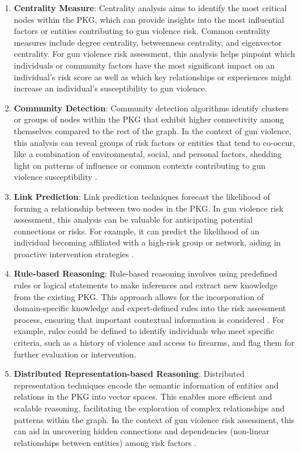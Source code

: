 \documentclass[11pt]{article}
\begin{document}
\begin{enumerate} [label=(\roman*)]
\item \textbf{Centrality Measure}: Centrality analysis aims to identify the most critical nodes within the PKG, which can provide insights into the most influential factors or entities contributing to gun violence risk. Common centrality measures include degree centrality, betweenness centrality, and eigenvector centrality. For gun violence risk assessment, this analysis helps pinpoint which individuals or community factors have the most significant impact on an individual's risk score \cite{yang2021research} as well as which key relationships or experiences might increase an individual’s susceptibility to gun violence.
\item \textbf{Community Detection}: Community detection algorithms identify clusters or groups of nodes within the PKG that exhibit higher connectivity among themselves compared to the rest of the graph. In the context of gun violence, this analysis can reveal groups of risk factors or entities that tend to co-occur, like a combination of environmental, social, and personal factors, shedding light on patterns of influence or common contexts contributing to gun violence susceptibility \cite{yang2021research}.
\item \textbf{Link Prediction}: Link prediction techniques forecast the likelihood of forming a relationship between two nodes in the PKG. In gun violence risk assessment, this analysis can be valuable for anticipating potential connections or risks. For example, it can predict the likelihood of an individual becoming affiliated with a high-risk group or network, aiding in proactive intervention strategies \cite{yang2021research}.
\item \textbf{Rule-based Reasoning}: Rule-based reasoning involves using predefined rules or logical statements to make inferences and extract new knowledge from the existing PKG. This approach allows for the incorporation of domain-specific knowledge and expert-defined rules into the risk assessment process, ensuring that important contextual information is considered \cite{sun2021generation}. For example, rules could be defined to identify individuals who meet specific criteria, such as a history of violence and access to firearms, and flag them for further evaluation or intervention.
\item \textbf{Distributed Representation-based Reasoning}: Distributed representation techniques encode the semantic information of entities and relations in the PKG into vector spaces. This enables more efficient and scalable reasoning, facilitating the exploration of complex relationships and patterns within the graph. In the context of gun violence risk assessment, this can aid in uncovering hidden connections and dependencies (non-linear relationships between entities) among risk factors \cite{chen2022overview}.

\end{enumerate}
\end{document}

